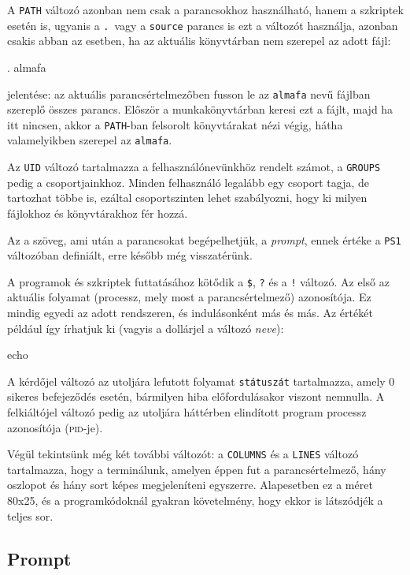 A \texttt{PATH} változó azonban nem csak a parancsokhoz használható, hanem a
szkriptek esetén is, ugyanis  a \texttt{.}\ vagy a \texttt{source} parancs is
ezt a változót használja, azonban csakis abban az esetben, ha az aktuális
könyvtárban nem szerepel az adott fájl:

\begin{VerbExample}
. almafa    
\end{VerbExample}

\noindent jelentése: az aktuális parancsértelmezőben fusson le az
\texttt{almafa} nevű
fájlban szereplő összes parancs. Először a munkakönyvtárban keresi ezt a fájlt,
majd ha itt nincsen, akkor a \texttt{PATH}-ban felsorolt könyvtárakat nézi
végig, hátha valamelyikben szerepel az \texttt{almafa}.

Az \texttt{UID} változó tartalmazza a felhasználónevünkhöz rendelt számot, a
\texttt{GROUPS} pedig a csoportjainkhoz. Minden felhasználó legalább egy csoport
tagja, de tartozhat többe is, ezáltal csoportszinten lehet szabályozni, hogy ki
milyen fájlokhoz és könyvtárakhoz fér hozzá.

Az a szöveg, ami után a parancsokat begépelhetjük, a \emph{prompt}, ennek értéke
a \texttt{PS1} változóban definiált, erre később még visszatérünk.

A programok és szkriptek futtatásához kötődik a  \texttt{\$}, \texttt{?} és a
\texttt{!} változó. Az első az aktuális folyamat (processz, mely most a
parancsértelmező) azonosítója. Ez mindig egyedi az adott rendszeren, és
indulásonként más és más. Az értékét például így írhatjuk ki (vagyis a dollárjel
a változó \emph{neve}):

\begin{VerbExample}
echo $$
\end{VerbExample}

\noindent A kérdőjel változó az utoljára lefutott folyamat \texttt{státuszát}
tartalmazza, amely 0 sikeres befejeződés esetén, bármilyen  hiba előfordulásakor
viszont nemnulla. A felkiáltójel változó pedig az utoljára háttérben elindított
program processz azonosítója (\textsc{pid}-je).

Végül tekintsünk még két további változót:
a \texttt{COLUMNS} és a \texttt{LINES} változó tartalmazza, hogy a terminálunk,
amelyen éppen fut a parancsértelmező, hány oszlopot és hány sort képes
megjeleníteni egyszerre. Alapesetben ez a méret 80x25, és a programkódoknál
gyakran követelmény, hogy ekkor is látszódjék a teljes sor.


\subsection{Prompt}

